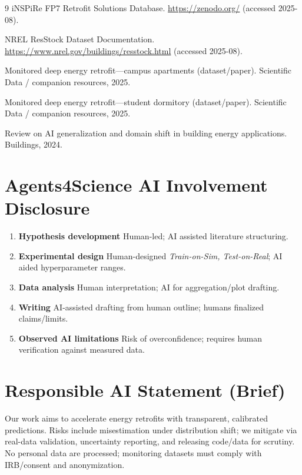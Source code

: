 \documentclass{article}
\begin{document}
% 
% 
\begin{thebibliography}{9}
iNSPiRe FP7 Retrofit Solutions Database. \url{https://zenodo.org/} (accessed 2025-08).

NREL ResStock Dataset Documentation. \url{https://www.nrel.gov/buildings/resstock.html} (accessed 2025-08).

Monitored deep energy retrofit---campus apartments (dataset/paper). Scientific Data / companion resources, 2025.

Monitored deep energy retrofit---student dormitory (dataset/paper). Scientific Data / companion resources, 2025.

Review on AI generalization and domain shift in building energy applications. Buildings, 2024.
\end{thebibliography}

\appendix
\section*{Agents4Science AI Involvement Disclosure}
\begin{enumerate}
  \item \textbf{Hypothesis development} \quad \involvementB{} \quad Human-led; AI assisted literature structuring.
  \item \textbf{Experimental design} \quad \involvementB{} \quad Human-designed \emph{Train-on-Sim, Test-on-Real}; AI aided hyperparameter ranges.
  \item \textbf{Data analysis} \quad \involvementB{} \quad Human interpretation; AI for aggregation/plot drafting.
  \item \textbf{Writing} \quad \involvementC{} \quad AI-assisted drafting from human outline; humans finalized claims/limits.
  \item \textbf{Observed AI limitations} \quad Risk of overconfidence; requires human verification against measured data.
\end{enumerate}

\section*{Responsible AI Statement (Brief)}
Our work aims to accelerate energy retrofits with transparent, calibrated predictions. 
Risks include misestimation under distribution shift; we mitigate via real-data validation, uncertainty reporting, and releasing code/data for scrutiny. 
No personal data are processed; monitoring datasets must comply with IRB/consent and anonymization.
\end{document}
